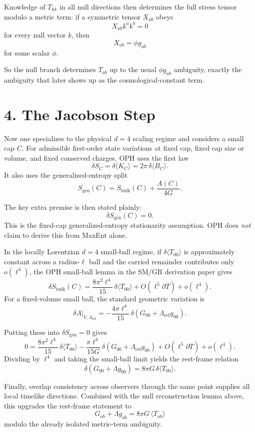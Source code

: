 \documentclass[10pt]{article}
\begin{document}
Knowledge of \(T_{kk}\) in all null directions then determines the full stress tensor modulo a metric term: if a symmetric tensor \(X_{ab}\) obeys
\[
X_{ab} k^a k^b = 0
\]
for every null vector \(k\), then
\[
X_{ab} = \phi g_{ab}
\]
for some scalar \(\phi\).

So the null branch determines \(T_{ab}\) up to the usual \(\phi g_{ab}\) ambiguity, exactly the ambiguity that later shows up as the cosmological-constant term.

\section*{4. The Jacobson Step}

Now one specializes to the physical \(d=4\) scaling regime and considers a small cap \(C\). For admissible first-order state variations at fixed cap, fixed cap size or volume, and fixed conserved charges, OPH uses the first law
\[
\delta S_C = \delta \langle K_C\rangle = 2\pi\,\delta\langle B_C\rangle.
\]
It also uses the generalized-entropy split
\[
S_{\mathrm{gen}}(C)=S_{\mathrm{bulk}}(C)+\frac{A(C)}{4G}.
\]

The key extra premise is then stated plainly:
\[
\delta S_{\mathrm{gen}}(C)=0.
\]
This is the fixed-cap generalized-entropy stationarity assumption. OPH does \emph{not} claim to derive this from MaxEnt alone.

In the locally Lorentzian \(d=4\) small-ball regime, if \(\delta\langle T_{00}\rangle\) is approximately constant across a radius-\(\ell\) ball and the carried remainder contributes only \(o(\ell^4)\), the OPH small-ball lemma in the SM/GR derivation paper gives
\[
\delta S_{\mathrm{bulk}}(C)
=
\frac{8\pi^2 \ell^4}{15}\,\delta\langle T_{00}\rangle
+ O(\ell^5 \partial T)+o(\ell^4).
\]
For a fixed-volume small ball, the standard geometric variation is
\[
\delta A\big|_{V,\Lambda_{\mathrm{ref}}}
=
-\frac{4\pi \ell^4}{15}\,
\delta\!\left(G_{00}+\Lambda_{\mathrm{ref}} g_{00}\right).
\]

Putting these into \(\delta S_{\mathrm{gen}}=0\) gives
\[
0
=
\frac{8\pi^2 \ell^4}{15}\,\delta\langle T_{00}\rangle
-\frac{\pi \ell^4}{15G}\,
\delta\!\left(G_{00}+\Lambda_{\mathrm{ref}} g_{00}\right)
+ O(\ell^5 \partial T)+o(\ell^4).
\]
Dividing by \(\ell^4\) and taking the small-ball limit yields the rest-frame relation
\[
\delta\!\left(G_{00}+\Lambda g_{00}\right)
=
8\pi G\,\delta\langle T_{00}\rangle.
\]

Finally, overlap consistency across observers through the same point supplies all local timelike directions. Combined with the null reconstruction lemma above, this upgrades the rest-frame statement to
\[
G_{ab}+\Lambda g_{ab}=8\pi G\,\langle T_{ab}\rangle
\]
modulo the already isolated metric-term ambiguity.
\end{document}
